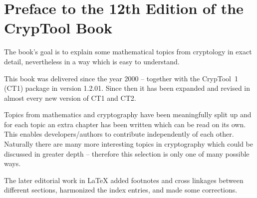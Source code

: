 %

\clearpage{}
{}
\chapter*{Preface to the 12th Edition of the CrypTool Book}

The book's goal is to explain some mathematical topics from cryptology in
exact detail, nevertheless in a way which is easy to understand.

This book was delivered since the year 2000 -- together with the CrypTool~1
(CT1) package in version 1.2.01. 
Since then it has been expanded and revised in almost every new version of CT1 and CT2.

Topics from mathematics and cryptography have been meaningfully split up and
for each topic an extra chapter has been written which can be read on its own.
This enables developers/authors to contribute independently of each other.
Naturally there are many more interesting topics in cryptography which could
be discussed in greater depth -- therefore this selection is only one of many
possible ways.

The later editorial work in LaTeX added footnotes and cross linkages between
different sections, harmonized the index entries, and made some corrections.

